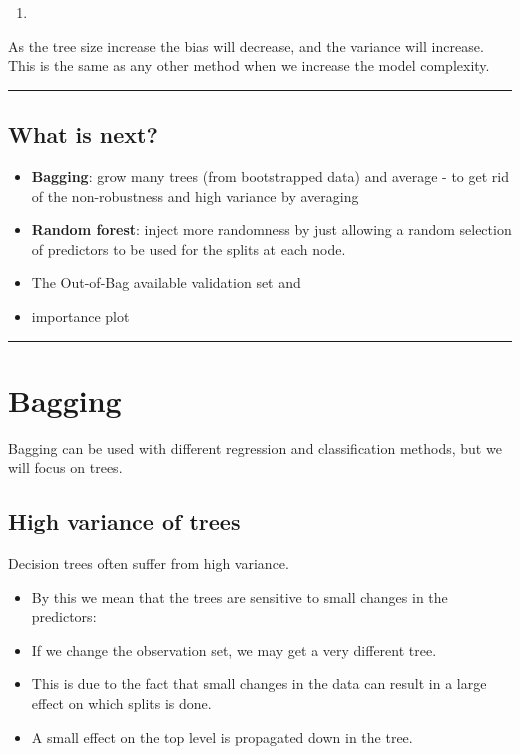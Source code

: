 \documentclass[
  letterpaper,
  DIV=11,
  numbers=noendperiod]{scrartcl}
\providecommand{\tightlist}{%
  \setlength{\itemsep}{0pt}\setlength{\parskip}{0pt}}\usepackage{longtable,booktabs,array}
\begin{document}
\begin{enumerate}
\def\labelenumi{\arabic{enumi})}
\setcounter{enumi}{6}
\tightlist
\item
\end{enumerate}

As the tree size increase the bias will decrease, and the variance will
increase. This is the same as any other method when we increase the
model complexity.

\begin{center}\rule{0.5\linewidth}{0.5pt}\end{center}

\hypertarget{what-is-next}{%
\subsection{What is next?}\label{what-is-next}}

\begin{itemize}
\tightlist
\item
  \textbf{Bagging}: grow many trees (from bootstrapped data) and average
  - to get rid of the non-robustness and high variance by averaging
\item
  \textbf{Random forest}: inject more randomness by just allowing a
  random selection of predictors to be used for the splits at each node.
\item
  The Out-of-Bag available validation set and
\item
  importance plot
\end{itemize}

\begin{center}\rule{0.5\linewidth}{0.5pt}\end{center}

\hypertarget{bagging}{%
\section{Bagging}\label{bagging}}

Bagging can be used with different regression and classification
methods, but we will focus on trees.

\hypertarget{high-variance-of-trees}{%
\subsection{High variance of trees}\label{high-variance-of-trees}}

Decision trees often suffer from high variance.

\begin{itemize}
\tightlist
\item
  By this we mean that the trees are sensitive to small changes in the
  predictors:
\item
  If we change the observation set, we may get a very different tree.
\item
  This is due to the fact that small changes in the data can result in a
  large effect on which splits is done.
\item
  A small effect on the top level is propagated down in the tree.
\end{itemize}
\end{document}
